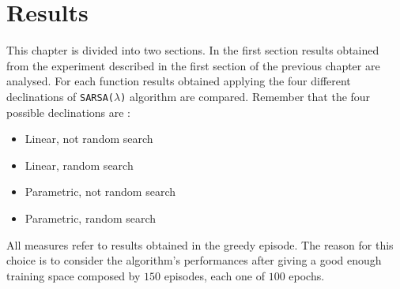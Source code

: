 \chapter{Results}

This chapter is divided into two sections. In the first section results obtained from the experiment described in the first section of the previous chapter are analysed. For each function results obtained applying the four different declinations of {\tt SARSA($\lambda$)} algorithm are compared. Remember that the four possible declinations are :

\begin{itemize}
	\item Linear, not random search
	\item Linear, random search
	\item Parametric, not random search
	\item Parametric, random search
\end{itemize}

All measures refer to results obtained in the greedy episode. The reason for this choice is to consider the algorithm's performances after giving a good enough training space composed by $150$ episodes, each one of $100$ epochs. \\

